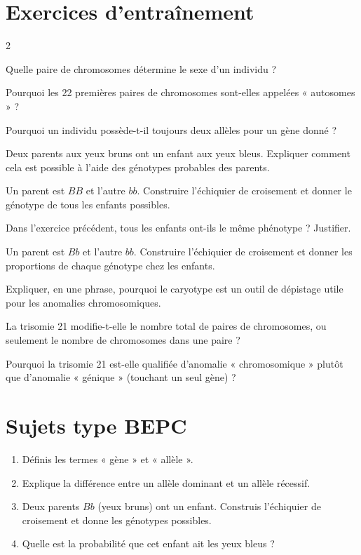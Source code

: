 \section{Exercices d'entraînement}
\begin{multicols}{2}

\exo{} Quelle paire de chromosomes détermine le sexe d'un individu ?

\exo{} Pourquoi les 22 premières paires de chromosomes sont-elles appelées
« autosomes » ?

\exo{} Pourquoi un individu possède-t-il toujours deux allèles pour un gène
donné ?

\exo{} Deux parents aux yeux bruns ont un enfant aux yeux bleus. Expliquer
comment cela est possible à l'aide des génotypes probables des parents.

\exo{} Un parent est $BB$ et l'autre $bb$. Construire l'échiquier de croisement
et donner le génotype de tous les enfants possibles.

\exo{} Dans l'exercice précédent, tous les enfants ont-ils le même phénotype ?
Justifier.

\exo{} Un parent est $Bb$ et l'autre $bb$. Construire l'échiquier de croisement
et donner les proportions de chaque génotype chez les enfants.

\exo{} Expliquer, en une phrase, pourquoi le caryotype est un outil de dépistage
utile pour les anomalies chromosomiques.

\exo{} La trisomie 21 modifie-t-elle le nombre total de paires de chromosomes,
ou seulement le nombre de chromosomes dans une paire ?

\exo{} Pourquoi la trisomie 21 est-elle qualifiée d'anomalie
« chromosomique » plutôt que d'anomalie « génique » (touchant un seul gène) ?

\end{multicols}

\section{Sujets type BEPC}

\begin{enumerate}[label=\arabic*)]
\item Définis les termes « gène » et « allèle ».
\item Explique la différence entre un allèle dominant et un allèle récessif.
\item Deux parents $Bb$ (yeux bruns) ont un enfant. Construis l'échiquier de
croisement et donne les génotypes possibles.
\item Quelle est la probabilité que cet enfant ait les yeux bleus ?
\end{enumerate}

